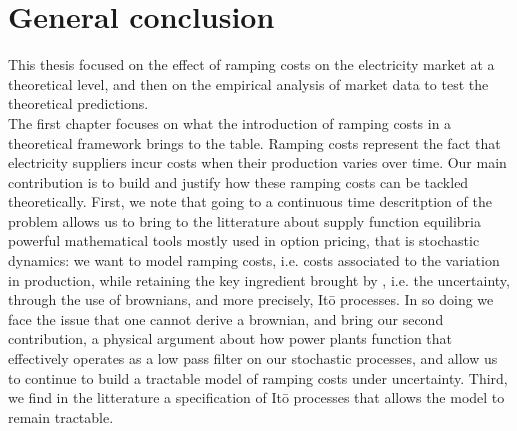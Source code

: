 \renewcommand{\thesection}{\arabic{chapter}.\arabic{section}}

\chapter*{General conclusion}
\label{chap:ccl}
\cleardoublepage
\doublespacing

This thesis focused on the effect of ramping costs on the electricity market at a theoretical level, and then on the empirical analysis of market data to test the theoretical predictions.\\

The first chapter focuses on what the introduction of ramping costs in a theoretical framework brings to the table. Ramping costs represent the fact that electricity suppliers incur costs when their production varies over time. Our main contribution is to build and justify how these ramping costs can be tackled theoretically. First, we note that going to a continuous time descritption of the problem allows us to bring to the litterature about supply function equilibria powerful mathematical tools mostly used in option pricing, that is stochastic dynamics: we want to model ramping costs, i.e. costs associated to the variation in production, while retaining the key ingredient brought by \cite{KM}, i.e. the uncertainty, through the use of brownians, and more precisely, It\={o} processes. In so doing we face the issue that one cannot derive a brownian, and bring our second contribution, a physical argument about how power plants function that effectively operates as a low pass filter on our stochastic processes, and allow us to continue to build a tractable model of ramping costs under uncertainty. Third, we find in the litterature a specification of It\={o} processes that allows the model to remain tractable. \\


